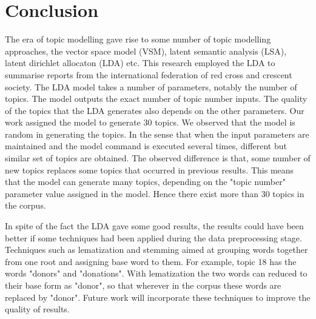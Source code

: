 \chapter{Conclusion}

\begin{flushleft}
  The era of topic modelling gave rise to some number of topic modelling approaches, the vector space model (VSM), latent semantic analysis (LSA), latent dirichlet allocaton (LDA) etc. This research employed the LDA to summarise reports from the international federation of red cross and crescent society.
  The LDA model takes a number of parameters, notably the number of topics. The model outputs the exact number of topic number inputs.
  The quality of the topics that the LDA generates also depends on the other parameters. Our work assigned the model to generate 30 topics. We observed that the model is random in generating the topics.
  In the sense that when the input parameters are maintained and the model command is executed several times, different but similar set of topics are obtained. The observed difference is that, some number of new topics replaces some topics that occurred in previous results. This means that the model can generate  many topics, depending on the "topic number" parameter value assigned in the model. Hence there exist more than 30 topics in the corpus.
\end{flushleft}
\begin{flushleft}
  In spite of the fact the LDA gave some good results, the results could have been better if some techniques had been applied during the data preprocessing stage. Techniques such as lematization and stemming aimed
  at grouping words
  together from one root and assigning base word to them. For example, topic 18 has the words "donors" and "donations". With lematization
  the two words can reduced to their base form as "donor", so that wherever
  in the corpus these words are replaced by "donor".  
  Future work will incorporate these techniques to improve the quality of results.
\end{flushleft}